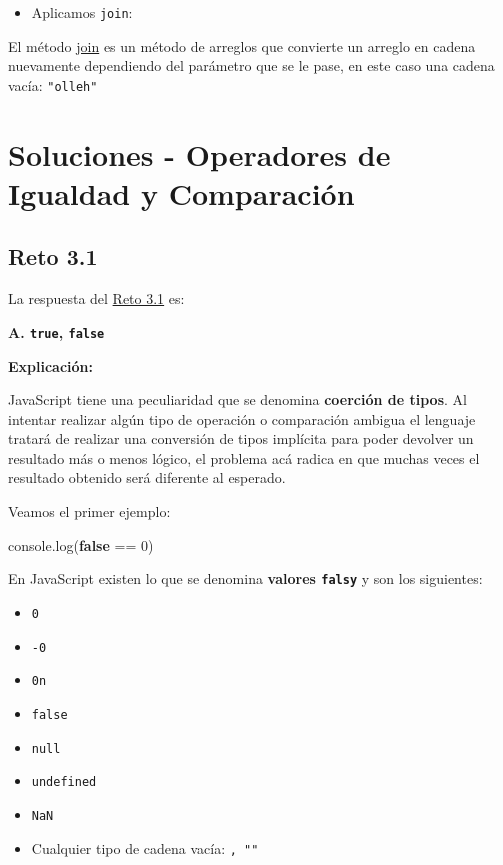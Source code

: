 \documentclass[
  letterpaper,
  DIV=11,
  numbers=noendperiod]{scrreprt}
\newenvironment{Shaded}{\begin{snugshade}}{\end{snugshade}}
\newcommand{\BuiltInTok}[1]{\textcolor[rgb]{0.00,0.23,0.31}{#1}}
\newcommand{\DecValTok}[1]{\textcolor[rgb]{0.68,0.00,0.00}{#1}}
\newcommand{\FunctionTok}[1]{\textcolor[rgb]{0.28,0.35,0.67}{#1}}
\newcommand{\KeywordTok}[1]{\textcolor[rgb]{0.00,0.23,0.31}{\textbf{#1}}}
\newcommand{\NormalTok}[1]{\textcolor[rgb]{0.00,0.23,0.31}{#1}}
\newcommand{\OperatorTok}[1]{\textcolor[rgb]{0.37,0.37,0.37}{#1}}
\providecommand{\tightlist}{%
  \setlength{\itemsep}{0pt}\setlength{\parskip}{0pt}}
\begin{document}
\begin{itemize}
\tightlist
\item
  Aplicamos \texttt{join}:
\end{itemize}

El método \hyperref[glos-join]{join} es un método de arreglos que
convierte un arreglo en cadena nuevamente dependiendo del parámetro que
se le pase, en este caso una cadena vacía: \texttt{"olleh"}

\chapter{Soluciones - Operadores de Igualdad y
Comparación}\label{soluciones---operadores-de-igualdad-y-comparaciuxf3n}

\section{Reto 3.1}\label{sec-sol-cap3-reto1}

La respuesta del \hyperref[sec-cap3-reto1]{Reto 3.1} es:

\textbf{A. \texttt{true}, \texttt{false}}

\textbf{Explicación:}

JavaScript tiene una peculiaridad que se denomina \textbf{coerción de
tipos}. Al intentar realizar algún tipo de operación o comparación
ambigua el lenguaje tratará de realizar una conversión de tipos
implícita para poder devolver un resultado más o menos lógico, el
problema acá radica en que muchas veces el resultado obtenido será
diferente al esperado.

Veamos el primer ejemplo:

\begin{Shaded}
\begin{Highlighting}[]
\BuiltInTok{console}\OperatorTok{.}\FunctionTok{log}\NormalTok{(}\KeywordTok{false} \OperatorTok{==} \DecValTok{0}\NormalTok{)}
\end{Highlighting}
\end{Shaded}

En JavaScript existen lo que se denomina \textbf{valores \texttt{falsy}}
y son los siguientes:

\begin{itemize}
\tightlist
\item
  \texttt{0}
\item
  \texttt{-0}
\item
  \texttt{0n}
\item
  \texttt{false}
\item
  \texttt{null}
\item
  \texttt{undefined}
\item
  \texttt{NaN}
\item
  Cualquier tipo de cadena vacía:
  \texttt{\textquotesingle{}\textquotesingle{},\ ""}
\end{itemize}
\end{document}
